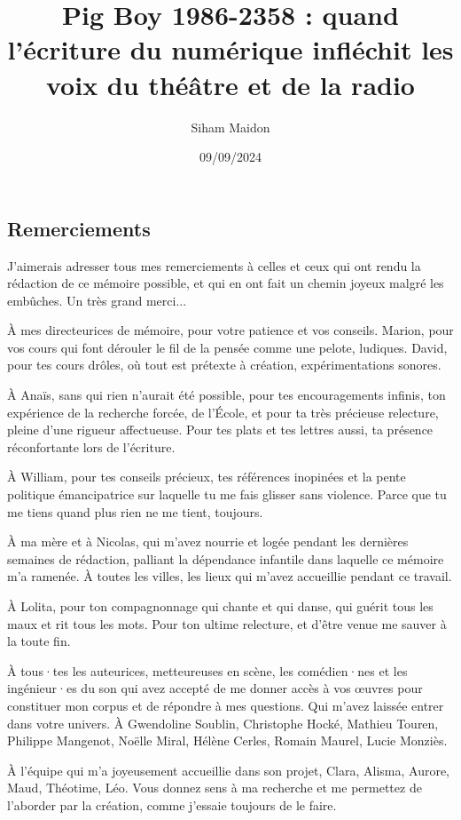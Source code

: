 \documentclass[
]{article}
\title{Pig Boy 1986-2358 : quand l'écriture du numérique infléchit les voix du théâtre et de la radio}
\author{Siham Maidon}
\date{09/09/2024}
\begin{document}
\maketitle

\subsection{Remerciements}\label{remerciements}

J'aimerais adresser tous mes remerciements à celles et ceux qui ont rendu la rédaction de ce mémoire possible, et qui en ont fait un chemin joyeux malgré les embûches. Un très grand merci...

À mes directeurices de mémoire, pour votre patience et vos conseils. Marion, pour vos cours qui font dérouler le fil de la pensée comme une pelote, ludiques. David, pour tes cours drôles, où tout est prétexte à création, expérimentations sonores.

À Anaïs, sans qui rien n'aurait été possible, pour tes encouragements infinis, ton expérience de la recherche forcée, de l'École, et pour ta très précieuse relecture, pleine d'une rigueur affectueuse. Pour tes plats et tes lettres aussi, ta présence réconfortante lors de l'écriture.

À William, pour tes conseils précieux, tes références inopinées et la pente politique émancipatrice sur laquelle tu me fais glisser sans violence. Parce que tu me tiens quand plus rien ne me tient, toujours.

À ma mère et à Nicolas, qui m'avez nourrie et logée pendant les dernières semaines de rédaction, palliant la dépendance infantile dans laquelle ce mémoire m'a ramenée. À toutes les villes, les lieux qui m'avez accueillie pendant ce travail.

À Lolita, pour ton compagnonnage qui chante et qui danse, qui guérit tous les maux et rit tous les mots. Pour ton ultime relecture, et d'être venue me sauver à la toute fin.

À tous·tes les auteurices, metteureuses en scène, les comédien·nes et les ingénieur·es du son qui avez accepté de me donner accès à vos œuvres pour constituer mon corpus et de répondre à mes questions. Qui m'avez laissée entrer dans votre univers. À Gwendoline Soublin, Christophe Hocké, Mathieu Touren, Philippe Mangenot, Noëlle Miral, Hélène Cerles, Romain Maurel, Lucie Monziès.

À l'équipe qui m'a joyeusement accueillie dans son projet, Clara, Alisma, Aurore, Maud, Théotime, Léo. Vous donnez sens à ma recherche et me permettez de l'aborder par la création, comme j'essaie toujours de le faire.
\end{document}
